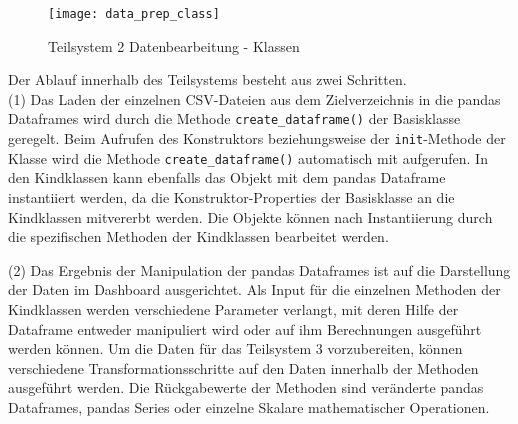     \begin{sidewaysfigure}

        \centering
            \texttt{[image: data\_prep\_class]}
            \caption{Teilsystem 2 Datenbearbeitung - Klassen}
            \label{fig:classes data_prep}
    \end{sidewaysfigure}

    Der Ablauf innerhalb des Teilsystems besteht aus zwei Schritten.\\
    (1) Das Laden der einzelnen CSV-Dateien aus dem Zielverzeichnis in die pandas Dataframes wird durch die Methode \texttt{create\_dataframe()} der Basisklasse geregelt.
    Beim Aufrufen des Konstruktors beziehungsweise der \texttt{init}-Methode der Klasse wird die Methode \texttt{create\_dataframe()} 
    automatisch mit aufgerufen. In den Kindklassen kann ebenfalls das Objekt mit dem pandas Dataframe instantiiert werden, da die Konstruktor-Properties der Basisklasse 
    an die Kindklassen mitvererbt werden. Die Objekte können nach Instantiierung durch die spezifischen Methoden der Kindklassen bearbeitet werden.
    
    (2) Das Ergebnis der Manipulation der pandas Dataframes ist auf die Darstellung der Daten im Dashboard ausgerichtet. Als Input für die einzelnen Methoden der
    Kindklassen werden verschiedene Parameter verlangt, mit deren Hilfe der Dataframe entweder manipuliert wird oder auf ihm Berechnungen ausgeführt werden können. 
    Um die Daten für das Teilsystem 3 vorzubereiten, können verschiedene Transformationsschritte auf den Daten innerhalb der Methoden ausgeführt werden. 
    Die Rückgabewerte der Methoden sind veränderte pandas Dataframes, pandas Series oder einzelne Skalare mathematischer Operationen.
    
    

        
